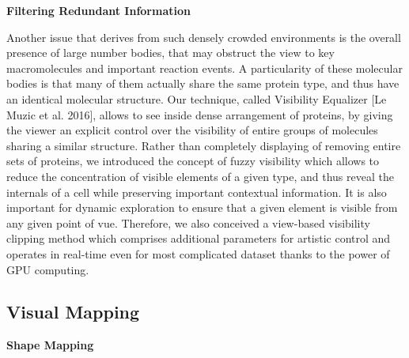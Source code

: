 \textbf{Filtering Redundant Information}

Another issue that derives from such densely crowded environments is the overall presence of large number bodies, that may obstruct the view to key macromolecules and important reaction events. 
A particularity of these molecular bodies is that many of them actually share the same protein type, and thus have an identical molecular structure.
Our technique, called Visibility Equalizer [Le Muzic et al. 2016], allows to see inside dense arrangement of proteins, by giving the viewer an explicit control over the visibility of entire groups of molecules sharing a similar structure. 
Rather than completely displaying of removing entire sets of proteins, we introduced the concept of fuzzy visibility which allows to reduce the concentration of visible elements of a given type, and thus reveal the internals of a cell while preserving important contextual information.
It is also important for dynamic exploration to ensure that a given element is visible from any given point of vue.
Therefore, we also conceived a view-based visibility clipping method which comprises additional parameters for artistic control and operates in real-time even for most complicated dataset thanks to the power of GPU computing.


\subsection{Visual Mapping}

\textbf{Shape Mapping}

